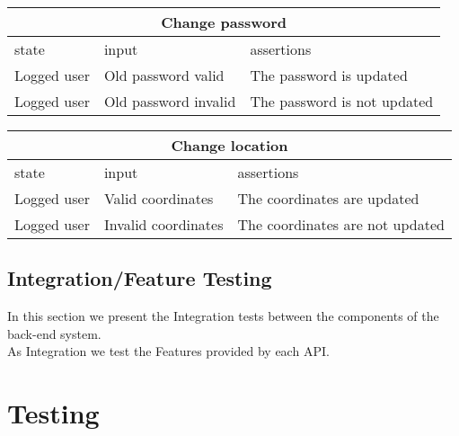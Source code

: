 \begin{center}
	\begin{tabular}{|p{}|p{}|p{}|}
		\hline
		\multicolumn{3}{c}{Change password}\\
		\hline
		state & input & assertions \\

		\hline
		Logged user &
		Old password valid& 
		The password is updated \newline
		\\
		\hline
		Logged user &
		Old password invalid& 
		The password is not updated \newline
		\\
		\hline
	\end{tabular}
\end{center}

\begin{center}
	\begin{tabular}{|p{}|p{}|p{}|}
		\hline
		\multicolumn{3}{c}{Change location}\\
		\hline
		state & input & assertions \\

		\hline
		Logged user &
		Valid coordinates& 
		The coordinates are updated \newline
		\\
		\hline
		Logged user &
		Invalid coordinates& 
		The coordinates are not updated \newline
		\\
		\hline
	\end{tabular}
\end{center}

\subsection{Integration/Feature Testing}
In this section we present the Integration tests between the components of the back-end system.\\
As Integration we test the Features provided by each API.\\



\section{Testing}
